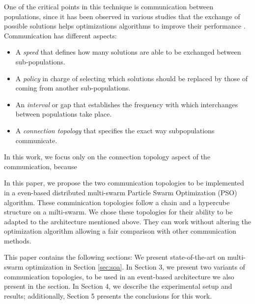 \documentclass[runningheads]{llncs}
\begin{document}
One of the critical points in this technique is communication between
populations, since it has been observed in various studies that the
exchange of possible solutions helps optimizations algorithms to improve their 
performance \cite{a2}. Communication has different aspects:

\begin{itemize}
    \item A {\em speed} that defines how many solutions are able to be exchanged between sub-populations.
    \item A {\em policy} in charge of selecting which solutions should
      be replaced by those of coming from another sub-populations.
    \item An {\em interval} or gap that establishes the frequency with
      which interchanges between populations take place.
    \item A {\em connection topology} that specifies the exact way
      subpopulations communicate.
\end{itemize}


In this work, we focus only on the connection topology aspect of the 
communication, because    

In this paper, we propose the two communication topologies to be
implemented in a even-based distributed multi-swarm Particle Swarm
Optimization (PSO) algorithm.  These comminication topologies follow a
chain and a hypercube structure on a milti-swarm. We chose these
topologies for their ability to be adapted to the architecture
mentioned above. They can work without altering the optimization
algorithm allowing a fair comparison with other communication methods.

This paper contains the following sections: We present
state-of-the-art on multi-swarm optimization in Section
\ref{sec:soa}. In Section 3, we present two variants of communication
topologies, to be used in an event-based architecture we also present
in the section. In Section 4, we describe the experimental setup and
results; additionally, Section 5 presents the conclusions for this
work.
\end{document}
